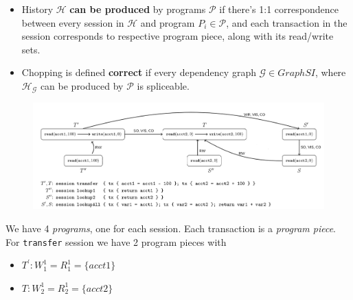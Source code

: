 \documentclass{beamer}
\begin{document}
\begin{frame}
	\begin{itemize}
		\item History $\mathcal{H}$ \textbf{can be produced} by programs $\mathcal{P}$ if there's 1:1 correspondence between every session in $\mathcal{H}$ and program $P_i\in\mathcal{P}$, and each transaction in the session corresponds to respective program piece, along with its read/write sets.
		\item Chopping is defined \textbf{correct} if every dependency graph $\mathcal{G}\in GraphSI$, where $\mathcal{H}_\mathcal{G}$ can be produced by $\mathcal{P}$ is spliceable.
	\end{itemize}
\end{frame}

\begin{frame}
	\begin{figure}
		\includegraphics[scale=0.28]{fig4}
	\end{figure}
	\begin{example}
		We have 4 \textit{programs}, one for each session. Each transaction is a \textit{program piece}. \\
		For \texttt{transfer} session we have 2 program pieces with
		\begin{itemize}
			\item $T^\prime: W^1_1 = R^1_1 = \{acct1\}$
			\item $T: W^1_2 = R^1_2 = \{acct2\}$
		\end{itemize}
	\end{example}
\end{frame}
\end{document}
